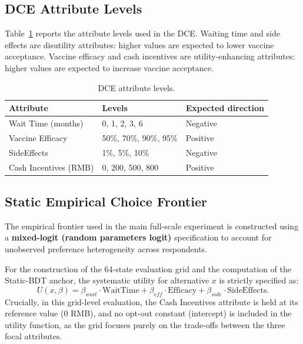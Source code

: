 \documentclass[11pt]{article}
\begin{document}
\subsection{DCE Attribute Levels}

Table~\ref{tab:dce_attributes} reports the attribute levels used in the DCE. Waiting time and side effects are disutility attributes: higher values are expected to lower vaccine acceptance. Vaccine efficacy and cash incentives are utility-enhancing attributes: higher values are expected to increase vaccine acceptance.

\begin{table}[htbp]
\centering
\caption{DCE attribute levels.}
\label{tab:dce_attributes}
\begin{tabular}{lll}
\hline
Attribute & Levels & Expected direction \\
\hline
Wait Time (months) & 0, 1, 2, 3, 6 & Negative \\
Vaccine Efficacy & 50\%, 70\%, 90\%, 95\% & Positive \\
SideEffects & 1\%, 5\%, 10\% & Negative \\
Cash Incentives (RMB) & 0, 200, 500, 800 & Positive \\
\hline
\end{tabular}
\end{table}

\subsection{Static Empirical Choice Frontier}

The empirical frontier used in the main full-scale experiment is constructed using a \textbf{mixed-logit (random parameters logit)} specification to account for unobserved preference heterogeneity across respondents. 

For the construction of the 64-state evaluation grid and the computation of the Static-BDT anchor, the systematic utility for alternative $x$ is strictly specified as:
\[
U(x, \beta) = \beta_{wait} \cdot \text{WaitTime} + \beta_{eff} \cdot \text{Efficacy} + \beta_{side} \cdot \text{SideEffects}.
\]
Crucially, in this grid-level evaluation, the Cash Incentives attribute is held at its reference value (0 RMB), and no opt-out constant (intercept) is included in the utility function, as the grid focuses purely on the trade-offs between the three focal attributes.
\end{document}
